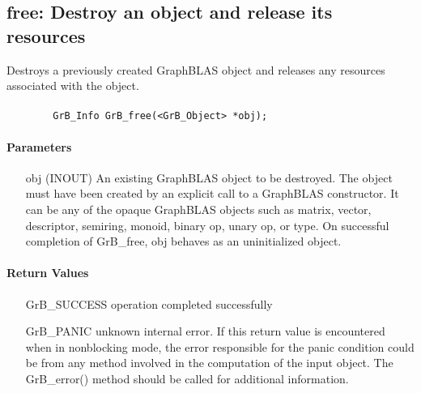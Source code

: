 \subsection{{\sf free}: Destroy an object and release its resources}

Destroys a previously created GraphBLAS object and releases any resources associated with the object.

\paragraph{\syntax}

\begin{verbatim}
        GrB_Info GrB_free(<GrB_Object> *obj);
\end{verbatim}


\paragraph{Parameters}

\begin{itemize}[leftmargin=1.1in]
	\item[{\sf obj}] ({\sf INOUT}) An existing GraphBLAS object to be destroyed. 
	The object must have been created by an explicit call to a GraphBLAS constructor.
    It can be any of the opaque GraphBLAS objects such as matrix, vector, descriptor, semiring, monoid, binary op, 
	unary op, or type. On successful completion of {\sf GrB\_free}, {\sf obj} behaves as an uninitialized object.
\end{itemize}

\paragraph{Return Values}

\begin{itemize}[leftmargin=2.1in]
\item[{\sf GrB\_SUCCESS}]        operation completed successfully
\item[{\sf GrB\_PANIC}]          unknown internal error.  If this return
value is encountered when in nonblocking mode, the error responsible for
the panic condition could be from any method involved in the computation
of the input object.  The {\sf GrB\_error()} method should be called
for additional information.
\end{itemize}

